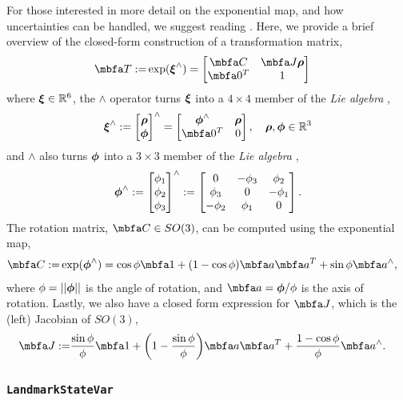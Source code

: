 \documentclass[10pt,letterpaper,fleqn,oneside]{article}
\newcommand{\code}[1]{\texttt{#1}}
\begin{document}
\noindent For those interested in more detail on the exponential map, and how uncertainties can be handled, we suggest reading \citet{barfoot_tro14}. 
Here, we provide a brief overview of the closed-form construction of a transformation matrix,
%
\begin{align}
\mbf{T} :=& \exp(\mbs{\xi}^\wedge) = \bbm \mbf{C} & \mbf{J}\mbs{\rho} \\ \mbf{0}^T & 1 \ebm
\end{align}
%
where ${\boldsymbol{\xi}} \in \mathbb{R}^6$, the $\wedge$ operator turns ${\boldsymbol{\xi}}$ into a $4 \times 4$ member of the \emph{Lie algebra} \algse,
%
\begin{align}
\mbs{\xi}^\wedge := \bbm \mbs{\rho} \\ \mbs{\phi} \ebm^\wedge 
= \bbm \mbs{\phi}^\wedge & \mbs{\rho} \\ \mbf{0}^T & 0 \ebm, \quad \mbs{\rho}, \mbs{\phi} \in \mathbb{R}^3
\end{align}
%
and $\wedge$ also turns ${\boldsymbol{\phi}}$ into a $3 \times 3$ member of the \emph{Lie algebra} \algso,
%
\begin{align*}
{\boldsymbol{\phi}}^\wedge := \begin{bmatrix} \phi_1 \\ \phi_2 \\ \phi_3 \end{bmatrix}^\wedge := \begin{bmatrix} 0 & -\phi_3 & \phi_2 \\ \phi_3 & 0 & -\phi_1 \\ -\phi_2 & \phi_1 & 0 \end{bmatrix}.
\end{align*}
%
The rotation matrix, $\mbf{C} \in SO(3)$, can be computed using the exponential map,
%
\begin{align}
\mbf{C} :=& \exp(\mbs{\phi}^\wedge) = \cos\phi \mbf{1} + (1 - \cos\phi) \mbf{a}\mbf{a}^T + \sin\phi\mbf{a}^\wedge,
\end{align}
%
where $\phi = ||{\boldsymbol{\phi}}||$ is the angle of rotation, and $\mbf{a} = \mbs{\phi}/\phi$ is the axis of rotation.
Lastly, we also have a closed form expression for $\mbf{J}$, which is the (left) Jacobian of $SO(3)$,
%
\begin{align}
\mbf{J} :=& \dfrac{\sin\phi}{\phi} \mbf{1} + \biggl(1 - \dfrac{\sin\phi}{\phi} \biggr) \mbf{a}\mbf{a}^T + \dfrac{1 - \cos\phi}{\phi} \mbf{a}^\wedge.
\end{align}


\subsubsection{\code{LandmarkStateVar}}
\label{sec:landmark}
\end{document}
